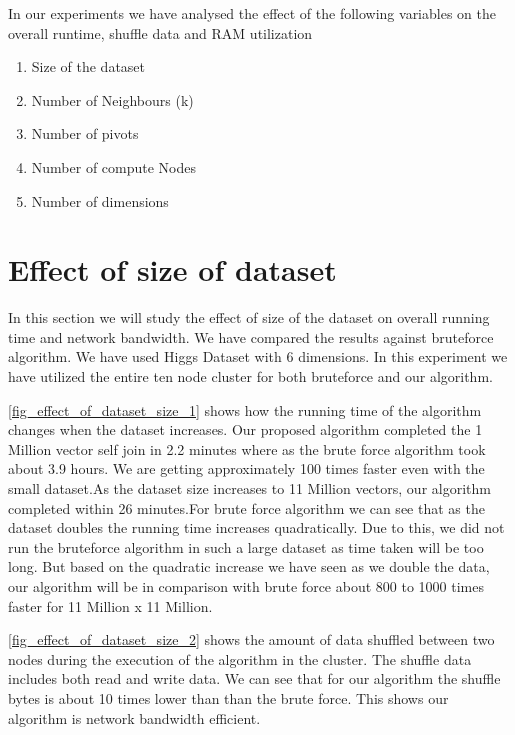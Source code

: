 \begin{minipage}{\linewidth}
In our experiments we have analysed the effect of the following variables on the
overall runtime, shuffle data and RAM utilization
\begin{enumerate}
\item Size of the dataset
\item Number of Neighbours (k)
\item Number of pivots
\item Number of compute Nodes
\item Number of dimensions
\end{enumerate}
\end{minipage}

\section{Effect of size of dataset}

In this section we will study the effect of size of the dataset on overall running
time and network bandwidth. We have compared the results against bruteforce algorithm.
We have used Higgs Dataset with 6 dimensions. In this experiment we
have utilized the entire ten node cluster for both bruteforce and our
algorithm.

\cref{fig_effect_of_dataset_size_1} shows how
the running time of the algorithm changes when the dataset increases.
Our proposed algorithm completed the 1 Million vector self join
in 2.2 minutes where as the brute force algorithm took about 3.9
hours. We are getting approximately 100 times faster even with the small
dataset.As the dataset size increases to 11 Million vectors, our
algorithm completed within 26 minutes.For brute force algorithm we can see that as the dataset doubles the running time
increases quadratically.  Due to this, we did not run the bruteforce
algorithm in such a large dataset as time taken will be too long. But
based on the quadratic increase we have seen as we double the data, our algorithm will be in comparison with
brute force about 800 to 1000 times faster for 11 Million x 11 Million.

\cref{fig_effect_of_dataset_size_2} shows the amount of data
shuffled between two nodes during the execution of the algorithm in
the cluster. The shuffle data includes both read and
write data. We can see that for our algorithm the shuffle bytes is
about 10 times lower than than the brute force. This shows our
algorithm is network bandwidth efficient.

